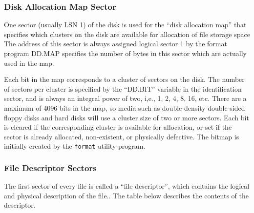 \documentclass[
]{article}
\begin{document}
\subsubsection{Disk Allocation Map Sector}\label{lsn1}

One sector (usually LSN 1) of the disk is used for the ``disk allocation
map'' that specifies which clusters on the disk are available for
allocation of file storage space The address of this sector is always
assigned logical sector 1 by the format program DD.MAP specifies the
number of bytes in this sector which are actually used in the map.

Each bit in the map corresponds to a cluster of sectors on the disk. The
number of sectors per cluster is specified by the ``DD.BIT'' variable in
the identification sector, and is always an integral power of two, i,e.,
1, 2, 4, 8, 16, etc. There are a maximum of 4096 bits in the map, so
media such as double-density double-sided floppy disks and hard disks
will use a cluster size of two or more sectors. Each bit is cleared if
the corresponding cluster is available for allocation, or set if the
sector is already allocated, non-existent, or physically defective. The
bitmap is initially created by the \texttt{format} utility program.

\subsubsection{File Descriptor Sectors}

The first sector of every file is called a ``file descriptor'', which
contains the logical and physical description of the file.. The table
below describes the contents of the descriptor.
\end{document}

